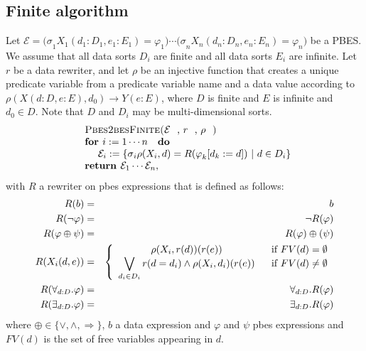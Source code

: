 \documentclass{article}
\begin{document}
\subsection{Finite algorithm}

Let $\mathcal{E=(\sigma }_{1}X_{1}(d_{1}:D_{1},e_{1}:E_{1})=\varphi
_{1})\cdots \mathcal{(\sigma }_{n}X_{n}(d_{n}:D_{n},e_{n}:E_{n})=\varphi
_{n})$ be a PBES. We assume that all data sorts $D_{i}$ are finite and all
data sorts $E_{i}$ are infinite. Let $r$ be a data rewriter, and let $\rho $
be an injective function that creates a unique predicate variable from a
predicate variable name and a data value according to $\rho
(X(d:D,e:E),d_{0})\rightarrow Y(e:E)$, where $D$ is finite and $E$ is
infinite and $d_{0}\in D$. Note that $D$ and $D_{i}$ may be
multi-dimensional sorts.%
\begin{equation*}
\begin{array}{l}
\text{\textsc{Pbes2besFinite(}}\mathcal{E}\text{, }r\text{, }\rho \text{%
\textsc{)}} \\ 
\text{\textbf{for }}i:=1\cdots n\text{ \textbf{do}} \\ 
\qquad \mathcal{E}_{i}:=\{\mathcal{\sigma }_{i}\rho (X_{i},d)=R(\varphi
_{k}[d_{k}:=d])\ |\ d\in D_{i}\} \\ 
\text{\textbf{return }}\mathcal{E}_{1}\cdots \mathcal{E}_{n},%
\end{array}%
\end{equation*}%
with $R$ a rewriter on pbes expressions that is defined as follows:%
\begin{eqnarray*}
R(b) &=&b \\
R(\lnot \varphi ) &=&\lnot R(\varphi ) \\
R(\varphi \oplus \psi ) &=&R(\varphi )\oplus (\psi ) \\
R(X_{i}(d,e)) &=&\left\{ 
\begin{array}{cc}
\rho (X_{i},r(d))(r(e)) & \text{if }FV(d)=\emptyset  \\ 
\dbigvee\limits_{d_{i}\in D_{i}}r(d=d_{i})\wedge \rho (X_{i},d_{i})(r(e)) & 
\text{if }FV(d)\neq \emptyset 
\end{array}%
\right.  \\
R(\forall _{d:D}.\varphi ) &=&\forall _{d:D}.R(\varphi ) \\
R(\exists _{d:D}.\varphi ) &=&\exists _{d:D}.R(\varphi )
\end{eqnarray*}%
where $\oplus \in \{\vee ,\wedge ,\Rightarrow \}$, $b$ a data expression and 
$\varphi $ and $\psi $ pbes expressions and $FV(d)$ is the set of free
variables appearing in $d$.
\end{document}
